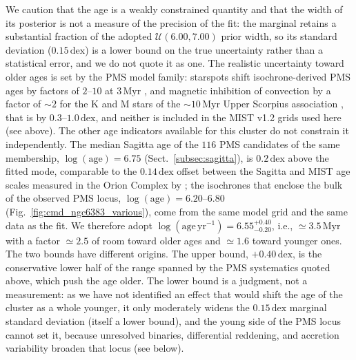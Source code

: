 \documentclass{aa}
\providecommand{\DIFaddtex}[1]{{\protect\color{red}\uwave{#1}}} %
\providecommand{\DIFaddbegin}{} %
\providecommand{\DIFaddend}{} %
\providecommand{\DIFadd}[1]{\texorpdfstring{\DIFaddtex{#1}}{#1}} %
\providecommand{\DIFaddincludegraphics}[2][]{{\color{blue}\fbox{\DIFOincludegraphics[#1]{#2}}}} %
\DeclareRobustCommand{\DIFaddbegin}{\DIFOaddbegin \let\includegraphics\DIFaddincludegraphics} %
\DeclareRobustCommand{\DIFaddend}{\DIFOaddend \let\includegraphics\DIFOincludegraphics} %
\begin{document}
We caution that the age is a weakly constrained quantity and that the width of its posterior is not a measure of the precision of the fit: the marginal retains a substantial fraction of the adopted $\mathcal{U}(6.00,7.00)$ prior width, so its standard deviation ($0.15\,\mathrm{dex}$) is a lower bound on the true uncertainty rather than a statistical error, and we do not quote it as one. The realistic uncertainty toward older ages is set by the PMS model family: starspots shift isochrone-derived PMS ages by factors of $2$--$10$ at $3\,\mathrm{Myr}$ \citep{2015ApJ...807..174S}, and magnetic inhibition of convection by a factor of $\sim2$ for the K and M stars of the $\sim10\,\mathrm{Myr}$ Upper Scorpius association \citep{2016A&A...593A..99F}, that is by $0.3$--$1.0\,\mathrm{dex}$, and neither is included in the MIST v1.2 grids used here (see above). The other age indicators available for this cluster do not constrain it independently. The median Sagitta age of the $116$ PMS candidates of the same membership, $\log(\mathrm{age})=6.75$ (Sect.~\ref{subsec:sagitta}), is $0.2\,\mathrm{dex}$ above the fitted mode, comparable to the $0.14\,\mathrm{dex}$ offset between the Sagitta and MIST age scales measured in the Orion Complex by \citet{2023AJ....165..182K}; the isochrones that enclose the bulk of the observed PMS locus, $\log(\mathrm{age})=6.20$--$6.80$ (Fig.~\ref{fig:cmd_ngc6383_various}), come from the same model grid and the same data as the fit. We therefore adopt\DIFaddbegin \DIFadd{ed}\DIFaddend{}  $\log(\mathrm{age}\,\mathrm{yr^{-1}}) = 6.55^{+0.40}_{-0.20}$, i.e., $\simeq3.5\,\mathrm{Myr}$ with a factor $\simeq2.5$ of room toward older ages and $\simeq1.6$ toward younger ones. The two bounds have different origins. The upper bound, $+0.40\,\mathrm{dex}$, is the conservative lower half of the range spanned by the PMS systematics quoted above, which push the age older. The lower bound is a judgment, not a measurement: as we have not identified an effect that would shift the age of the cluster as a whole younger, it only moderately widens the $0.15\,\mathrm{dex}$ marginal standard deviation (itself a lower bound), and the young side of the PMS locus cannot set it, because unresolved binaries, differential reddening, and accretion variability broaden that locus (see below).
\end{document}
